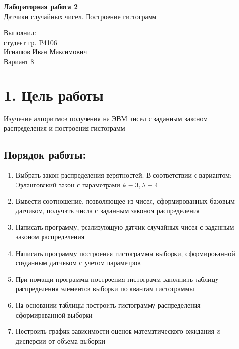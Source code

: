 \documentclass[12pt]{article}
\begin{document}



\begin{center}
	\LARGE 
	\textbf{Лабораторная работа 2}\\
	Датчики случайных чисел. Построение гистограмм
	\\[3\baselineskip]
\end{center}

\begin{flushright}
	\large
	Выполнил:\\
	студент гр. P4106\\
	Игнашов Иван Максимович\\
	Вариант 8\\
\end{flushright}

\newpage

 \section*{1. Цель работы}
Изучение алгоритмов получения на ЭВМ чисел с заданным законом
распределения и построения гистограмм

\subsection*{Порядок работы:}
\begin{enumerate}
	\item Выбрать закон распределения верятностей. В соответствии с вариантом: Эрланговский закон с параметрами $k=3, \lambda=4$
	\item Вывести соотношение, позволяющее из чисел, сформированных базовым
датчиком, получить числа с заданным законом распределения
	\item Написать программу, реализующую датчик случайных чисел с заданным
законом распределения
	\item Написать программу построения гистограммы выборки, сформированной
созданным датчиком с учетом параметров
	\item При помощи программы построения гистограмм заполнить таблицу распределения элементов выборки по квантам гистограммы
	\item На основании таблицы построить гистограмму распределения сформированной выборки
	\item Построить график зависимости оценок математического ожидания и
дисперсии от объема выборки
\end{enumerate}
\end{document}
